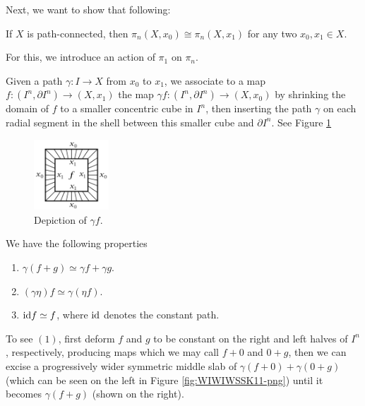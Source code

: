   Next, we want to show that following:
  \begin{proposition}[]\label{Prop:SwjiaKKDNW1102}
      If $X$ is path-connected, then
      $\pi_n\left( X, x_0 \right) \cong
      \pi_n (X, x_1)$ for any two $x_0,x_1 \in X$.
  \end{proposition}

  For this, we introduce an action of
  $\pi_1$ on $\pi_n$.

  \begin{definition}
      Given a path
      $\gamma \colon I \to X$ from
      $x_0$ to $x_1$, we associate to a map
      $f \colon \left( I^{n}, \partial I^{n} \right) \to 
      \left( X, x_1 \right) $ the map
      $\gamma f \colon \left( I^{n}, \partial I^{n} \right) 
      \to \left( X,x_0 \right) $ by shrinking the domain
      of $f$ to a smaller concentric cube in $I^{n}$, then
      inserting the path $\gamma$ on each radial segment
      in the shell between this smaller cube and $\partial
      I^{n}$.
      See Figure \ref{fig:JDWIXHHX011SJ-png}

      \begin{figure}[htpb]
          \centering
          \includegraphics[width=0.25\textwidth]{Figures/JDWIXHHX011SJ.png}
          \caption{Depiction of $\gamma f$.}
          \label{fig:JDWIXHHX011SJ-png}
      \end{figure}

  \begin{note}
      We have the following properties
      \begin{enumerate}
          \item $\gamma \left( f+ g \right) 
              \simeq \gamma f + \gamma g$.
          \item $\left( \gamma \eta \right) f \simeq
              \gamma \left( \eta f \right) $.
          \item ${\mathrm{id}} f \simeq f$, where
              ${\mathrm{id}}$ denotes the constant path.
      \end{enumerate}

      To see $(1)$, first deform $f$ and $g$ to be
      constant on the right and left halves of
      $I^{n}$, respectively, producing maps
      which we may call $f+0$ and $0+g$, then we 
      can excise a progressively wider symmetric middle slab
      of $\gamma (f+0) + \gamma(0+g)$ (which can be
      seen on the left in Figure \ref{fig:WIWIWSSK11-png})
      until it becomes $\gamma \left( f+g \right) $ (shown on the
      right).


\end{note}
\end{definition}
